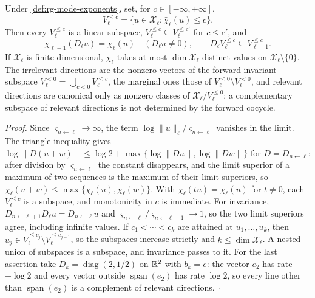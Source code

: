 Under \cref{def:rg-mode-exponents}, set, for \(c\in[-\infty,+\infty]\),
\begin{equation}
V_\ell^{\leq c}=\{u\in \mathscr X_\ell:\bar\chi_\ell(u)\leq c\}.
\label{eq:rg-lyapunov-filtration}
\end{equation}
Then every \(V_\ell^{\leq c}\) is a linear subspace,
\(V_\ell^{\leq c}\subseteq V_\ell^{\leq c'}\) for \(c\leq c'\), and
\begin{equation}
\bar\chi_{\ell+1}(D_\ell u)=\bar\chi_\ell(u)\quad(D_\ell u\neq0),
\qquad
D_\ell V_\ell^{\leq c}\subseteq V_{\ell+1}^{\leq c}.
\label{eq:rg-filtration-invariance}
\end{equation}
If \(\mathscr X_\ell\) is finite dimensional, \(\bar\chi_\ell\) takes at most
\(\dim \mathscr X_\ell\) distinct values on \(\mathscr X_\ell\setminus\{0\}\). The irrelevant
directions are the nonzero vectors of the forward-invariant subspace
\(V_\ell^{<0}=\bigcup_{c<0}V_\ell^{\leq c}\), the marginal ones those of
\(V_\ell^{\leq0}\setminus V_\ell^{<0}\), and relevant directions are canonical
only as nonzero classes of \(\mathscr X_\ell/V_\ell^{\leq0}\); a complementary subspace
of relevant directions is not determined by the forward cocycle.

\noindent\emph{Proof.}
Since \(\varsigma_{n\leftarrow\ell}\to\infty\), the term
\(\log\lVert u\rVert_\ell/\varsigma_{n\leftarrow\ell}\) vanishes in the limit.
The triangle inequality gives
\(\log\lVert D(u+w)\rVert\leq\log2
+\max\{\log\lVert Du\rVert,\log\lVert Dw\rVert\}\) for
\(D=D_{n\leftarrow\ell}\); after division by \(\varsigma_{n\leftarrow\ell}\)
the constant disappears, and the limit superior of a maximum of two sequences
is the maximum of their limit superiors, so
\(\bar\chi_\ell(u+w)\leq\max\{\bar\chi_\ell(u),\bar\chi_\ell(w)\}\). With
\(\bar\chi_\ell(tu)=\bar\chi_\ell(u)\) for \(t\neq0\), each
\(V_\ell^{\leq c}\) is a subspace, and monotonicity in \(c\) is immediate. For
invariance, \(D_{n\leftarrow\ell+1}D_\ell u=D_{n\leftarrow\ell}u\) and
\(\varsigma_{n\leftarrow\ell}/\varsigma_{n\leftarrow\ell+1}\to1\), so the two
limit superiors agree, including infinite values. If
\(c_1<\cdots<c_k\) are attained at \(u_1,\ldots,u_k\), then
\(u_j\in V_\ell^{\leq c_j}\setminus V_\ell^{\leq c_{j-1}}\), so the subspaces
increase strictly and \(k\leq\dim \mathscr X_\ell\). A nested union of subspaces is a
subspace, and invariance passes to it. For the last assertion take
\(D_k=\operatorname{diag}(2,1/2)\) on \(\mathbb R^2\) with \(b_k=e\): the vector
\(e_2\) has rate \(-\log2\) and every vector outside
\(\operatorname{span}(e_2)\) has rate \(\log2\), so every line other than
\(\operatorname{span}(e_2)\) is a complement of relevant directions.
\(\square\)

